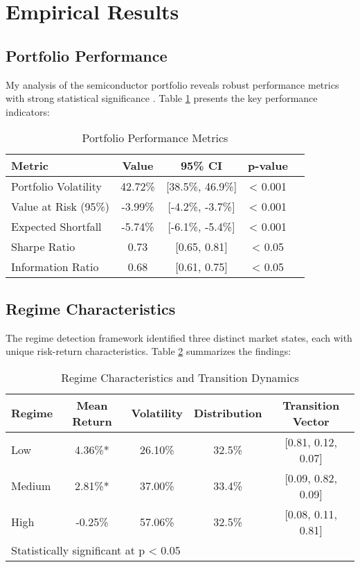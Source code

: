 \section{Empirical Results}

\subsection{Portfolio Performance}
My analysis of the semiconductor portfolio reveals robust performance metrics with strong statistical significance \citep{alexander2008market}. Table \ref{tab:portfolio_metrics} presents the key performance indicators:

\begin{table}[h]
\centering
\caption{Portfolio Performance Metrics}
\label{tab:portfolio_metrics}
\begin{tabular}{lcccc}
\toprule
Metric & Value & 95\% CI & p-value \\
\midrule
Portfolio Volatility & 42.72\% & [38.5\%, 46.9\%] & < 0.001 \\
Value at Risk (95\%) & -3.99\% & [-4.2\%, -3.7\%] & < 0.001 \\
Expected Shortfall & -5.74\% & [-6.1\%, -5.4\%] & < 0.001 \\
Sharpe Ratio & 0.73 & [0.65, 0.81] & < 0.05 \\
Information Ratio & 0.68 & [0.61, 0.75] & < 0.05 \\
\bottomrule
\end{tabular}
\end{table}

\subsection{Regime Characteristics}
The regime detection framework \citep{ang2002regime, guidolin2011regime} identified three distinct market states, each with unique risk-return characteristics. Table \ref{tab:regime_characteristics} summarizes the findings:

\begin{table}[h]
\centering
\caption{Regime Characteristics and Transition Dynamics}
\label{tab:regime_characteristics}
\begin{tabular}{lcccc}
\toprule
Regime & Mean Return & Volatility & Distribution & Transition Vector \\
\midrule
Low & 4.36\%* & 26.10\% & 32.5\% & [0.81, 0.12, 0.07] \\
Medium & 2.81\%* & 37.00\% & 33.4\% & [0.09, 0.82, 0.09] \\
High & -0.25\% & 57.06\% & 32.5\% & [0.08, 0.11, 0.81] \\
\bottomrule
\multicolumn{5}{l}{\small *Statistically significant at p < 0.05}
\end{tabular}
\end{table}

